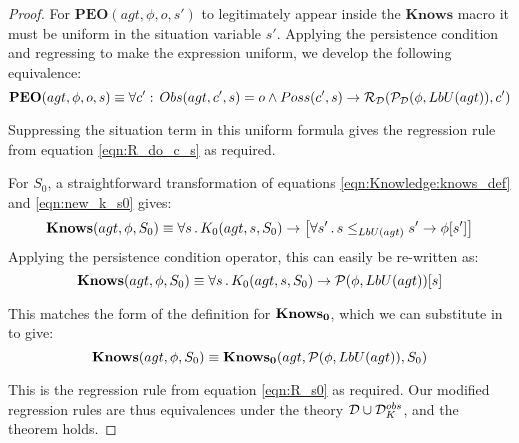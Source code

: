 \begin{proof}
For $\mathbf{PEO}(agt,\phi,o,s')$ to legitimately appear inside the
$\mathbf{Knows}$ macro it must be uniform in the situation variable
$s'$. Applying the persistence condition and regressing to make the
expression uniform, we develop the following equivalence:\[
\mathbf{PEO}(agt,\phi,o,s)\equiv\forall c':\, Obs(agt,c',s)=o\wedge Poss(c',s)\rightarrow\mathcal{R}_{\mathcal{D}}(\mathcal{P}_{\mathcal{D}}(\phi,LbU(agt)),c')\]


Suppressing the situation term in this uniform formula gives the regression
rule from equation \eqref{eqn:R_do_c_s} as required.

For $S_{0}$, a straightforward transformation of equations \eqref{eqn:Knowledge:knows_def}
and \eqref{eqn:new_k_s0} gives:\[
\mathbf{Knows}(agt,\phi,S_{0})\equiv\forall s\,.\, K_{0}(agt,s,S_{0})\rightarrow\left[\forall s'\,.\, s\leq_{LbU(agt)}s'\rightarrow\phi[s']\right]\]
 Applying the persistence condition operator, this can easily be re-written
as:\[
\mathbf{Knows}(agt,\phi,S_{0})\equiv\forall s\,.\, K_{0}(agt,s,S_{0})\rightarrow\mathcal{P}(\phi,LbU(agt))[s]\]


This matches the form of the definition for $\mathbf{Knows_{0}}$, which we can
substitute in to give:\[
\mathbf{Knows}(agt,\phi,S_{0})\equiv\mathbf{Knows_{0}}(agt,\mathcal{P}(\phi,LbU(agt)),S_{0})\]


This is the regression rule from equation \eqref{eqn:R_s0} as required.
Our modified regression rules are thus equivalences under the theory
$\mathcal{D}\cup\mathcal{D}_{K}^{obs}$, and the theorem holds. 
\end{proof}
\medskip{}


